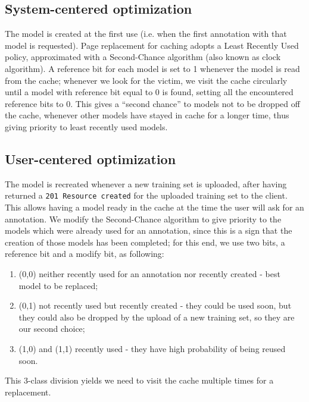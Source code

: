 \documentclass[a4paper,11pt]{report}
\begin{document}
\subsection*{System-centered optimization}
The model is created at the first use (i.e. when the first annotation with that model is requested). Page replacement for caching adopts a Least Recently Used policy, approximated with a Second-Chance algorithm (also known as clock algorithm). A reference bit for each model is set to 1 whenever the model is read from the cache; whenever we look for the victim, we visit the cache circularly until a model with reference bit equal to 0 is found, setting all the encountered reference bits to 0. This gives a ``second chance'' to models not to be dropped off the cache, whenever other models have stayed in cache for a longer time, thus giving priority to least recently used models.
\subsection*{User-centered optimization}
The model is recreated whenever a new training set is uploaded, after having returned a \texttt{201 Resource created} for the uploaded training set to the client. This allows having a model ready in the cache at the time the user will ask for an annotation. We modify the Second-Chance algorithm to give priority to the models which were already used for an annotation, since this is a sign that the creation of those models has been completed; for this end, we use two bits, a reference bit and a modify bit, as following:
\begin{enumerate}
\item (0,0) neither recently used for an annotation nor recently created - best model to be replaced;
\item (0,1) not recently used but recently created - they could be used soon, but they could also be dropped by the upload of a new training set, so they are our second choice;
\item (1,0) and (1,1) recently used - they have high probability of being reused soon.
\end{enumerate}
This 3-class division yields we need to visit the cache multiple times for a replacement.
\end{document}
